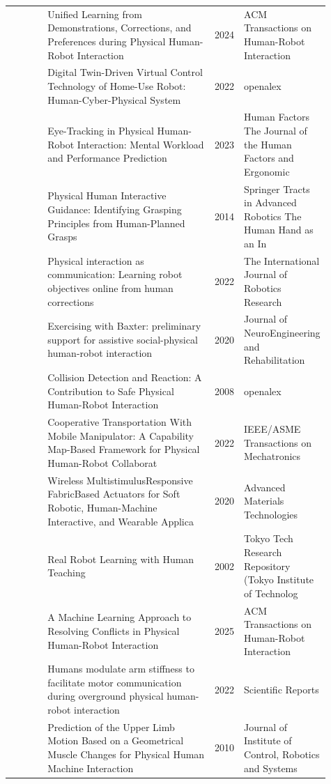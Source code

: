 \documentclass{article}
\begin{document}
\begin{center}
\begin{longtable}{p{0.12\linewidth}p{0.53\linewidth}p{0.08\linewidth}p{0.18\linewidth}}
\citep{pool85_21} & Unified Learning from Demonstrations, Corrections, and Preferences during Physical Human-Robot Interaction & 2024 & ACM Transactions on Human-Robot Interaction\\
\citep{pool85_22} & Digital Twin-Driven Virtual Control Technology of Home-Use Robot: Human-Cyber-Physical System & 2022 & openalex\\
\citep{pool85_23} & Eye-Tracking in Physical Human-Robot Interaction: Mental Workload and Performance Prediction & 2023 & Human Factors The Journal of the Human Factors and Ergonomic\\
\citep{pool85_24} & Physical Human Interactive Guidance: Identifying Grasping Principles from Human-Planned Grasps & 2014 & Springer Tracts in Advanced Robotics The Human Hand as an In\\
\citep{pool85_25} & Physical interaction as communication: Learning robot objectives online from human corrections & 2022 & The International Journal of Robotics Research\\
\citep{pool85_26} & Exercising with Baxter: preliminary support for assistive social-physical human-robot interaction & 2020 & Journal of NeuroEngineering and Rehabilitation\\
\citep{pool85_27} & Collision Detection and Reaction: A Contribution to Safe Physical Human-Robot Interaction & 2008 & openalex\\
\citep{pool85_28} & Cooperative Transportation With Mobile Manipulator: A Capability Map-Based Framework for Physical Human-Robot Collaborat & 2022 & IEEE/ASME Transactions on Mechatronics\\
\citep{pool85_29} & Wireless MultistimulusResponsive FabricBased Actuators for Soft Robotic, Human-Machine Interactive, and Wearable Applica & 2020 & Advanced Materials Technologies\\
\citep{pool85_30} & Real Robot Learning with Human Teaching & 2002 & Tokyo Tech Research Repository (Tokyo Institute of Technolog\\
\citep{pool85_31} & A Machine Learning Approach to Resolving Conflicts in Physical Human-Robot Interaction & 2025 & ACM Transactions on Human-Robot Interaction\\
\citep{pool85_32} & Humans modulate arm stiffness to facilitate motor communication during overground physical human-robot interaction & 2022 & Scientific Reports\\
\citep{pool85_33} & Prediction of the Upper Limb Motion Based on a Geometrical Muscle Changes for Physical Human Machine Interaction & 2010 & Journal of Institute of Control, Robotics and Systems\\

\end{longtable}
\end{center}
\end{document}
